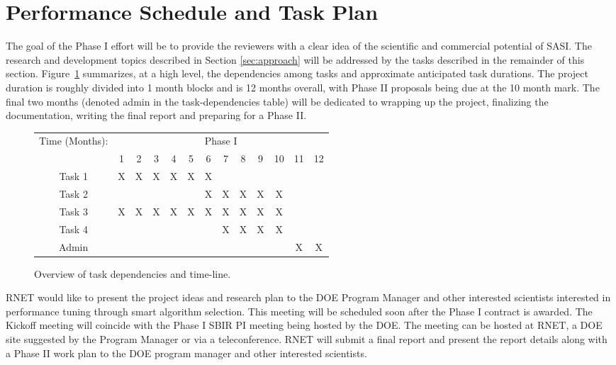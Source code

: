 \section{Performance Schedule and Task Plan}
\label{sec:taskplan}

The goal of the Phase I effort will be to provide the reviewers with a clear idea 
of the scientific and commercial potential of SASI. The research and development topics 
described in Section \ref{sec:approach} will be addressed by the tasks described in the remainder of this section. 
Figure~\ref{fig:tasks} summarizes, at a high level, the dependencies among tasks 
and approximate anticipated task durations. The project duration is roughly 
divided into 1 month blocks and is 12 months overall, with Phase II proposals being due at the 10 month mark. The final two months (denoted admin in the task-dependencies table) will be dedicated to wrapping up the project, finalizing the documentation, writing the final 
report and preparing for a Phase II. 

\begin{figure}
\centering
\begin{tabular}{|c|c|c|c|c|c|c|c|c|c|c|c|c|}
   \hline 
   \multirow{2}{*}{ Time (Months): } & \multicolumn{12}{|c|}{ Phase I } \\
   \cline{2-12} 
   & 1 & 2 & 3 & 4 & 5 & 6 & 7 &8 & 9 & 10 & 11 & 12 \\
   \hline 
   Task 1 & X & X & X  & X &  X & X & & & & & &  \\
   \hline
   Task 2 & & & & & & X& X & X & X &X & &   \\
  \hline
   Task 3 &X &X &X & X & X & X & X & X & X & X & &\\
  \hline
   Task 4 & & & &  &  &  & X & X & X & X & & \\
  \hline
   Admin & & & &  &  &  &  & & &  & X & X\\
  \hline

\end{tabular}
\caption{Overview of task dependencies and time-line.}
\label{fig:tasks}
\end{figure}


RNET would like to present the project ideas and research plan to the DOE 
Program Manager and other interested scientists interested in performance tuning
through smart algorithm selection. This meeting will 
be scheduled soon after the Phase I contract is awarded. The Kickoff meeting 
will coincide with the Phase I SBIR PI meeting being hosted by the DOE. The 
meeting can be hosted at RNET, a DOE site suggested by the Program Manager or 
via a teleconference. RNET will submit a final report and present the report 
details along with a Phase II work plan to the DOE program manager and other 
interested scientists.

